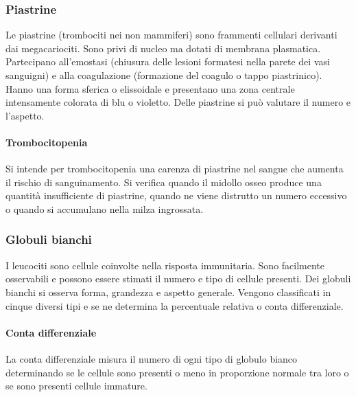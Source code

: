 		\subsubsection{Piastrine}
		Le piastrine (trombociti nei non mammiferi) sono frammenti cellulari derivanti dai megacariociti. 
		Sono privi di nucleo ma dotati di membrana plasmatica. 
		Partecipano all'emostasi (chiusura delle lesioni formatesi nella parete dei vasi sanguigni) e alla coagulazione (formazione del coagulo o tappo piastrinico).
		Hanno una forma sferica o elissoidale e presentano una zona centrale intensamente colorata di blu o violetto.
		Delle piastrine si pu\`o valutare il numero e l'aspetto.
			
			\paragraph{Trombocitopenia}
			Si intende per trombocitopenia una carenza di piastrine nel sangue che aumenta il rischio di sanguinamento. 
			Si verifica quando il midollo osseo produce una quantit\`a insufficiente di piastrine, quando ne viene distrutto un numero eccessivo o quando si accumulano nella milza ingrossata.

		\subsubsection{Globuli bianchi}
		I leucociti sono cellule coinvolte nella risposta immunitaria.
		Sono facilmente osservabili e possono essere stimati il numero e tipo di cellule presenti. 
		Dei globuli bianchi si osserva forma, grandezza e aspetto generale. 
		Vengono classificati in cinque diversi tipi e se ne determina la percentuale relativa o conta differenziale. 

			\paragraph{Conta differenziale}
			La conta differenziale misura il numero di ogni tipo di globulo bianco determinando se le cellule sono presenti o meno in proporzione normale tra loro o se sono presenti cellule immature.

